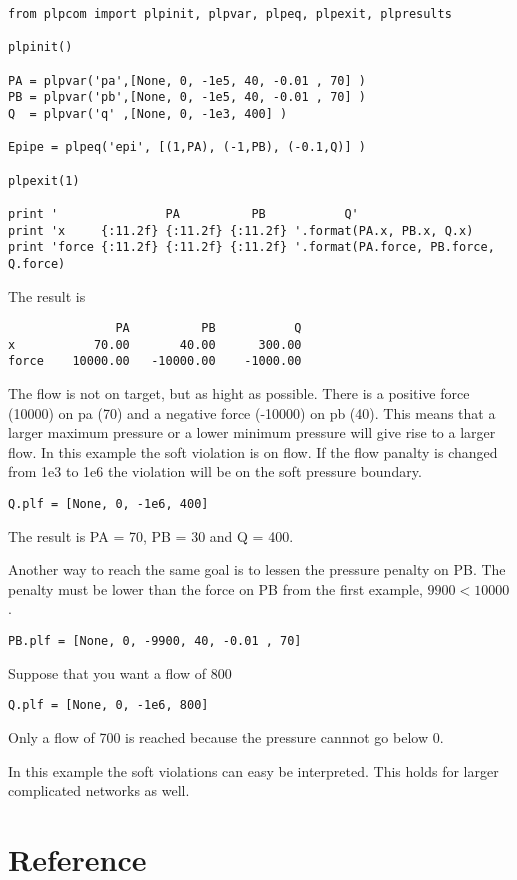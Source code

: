 \documentclass[]{article}
\begin{document}
\begin{verbatim}
from plpcom import plpinit, plpvar, plpeq, plpexit, plpresults

plpinit()

PA = plpvar('pa',[None, 0, -1e5, 40, -0.01 , 70] )
PB = plpvar('pb',[None, 0, -1e5, 40, -0.01 , 70] )
Q  = plpvar('q' ,[None, 0, -1e3, 400] )

Epipe = plpeq('epi', [(1,PA), (-1,PB), (-0.1,Q)] )

plpexit(1)

print '               PA          PB           Q'
print 'x     {:11.2f} {:11.2f} {:11.2f} '.format(PA.x, PB.x, Q.x)
print 'force {:11.2f} {:11.2f} {:11.2f} '.format(PA.force, PB.force, Q.force)
\end{verbatim}
The result is 
\begin{verbatim}
               PA          PB           Q
x           70.00       40.00      300.00 
force    10000.00   -10000.00    -1000.00 
\end{verbatim}
The flow is not on target, but as hight as possible.
There is a positive force (10000) on pa (70) and a negative force (-10000) on pb (40).
This means that a larger maximum pressure or a lower minimum pressure
will give rise to a larger flow.
In this example the soft violation is on flow.
If the flow panalty is changed from 1e3 to 1e6 the violation will be on the soft pressure boundary.
\begin{verbatim}
Q.plf = [None, 0, -1e6, 400]
\end{verbatim}
The result is PA = 70, PB = 30 and Q = 400.

Another way to reach the same goal is to lessen the pressure penalty on PB.
The penalty must be lower than the force on PB from the first example, $9900 < 10000$.
\begin{verbatim}
PB.plf = [None, 0, -9900, 40, -0.01 , 70]
\end{verbatim}
Suppose that you want a flow of 800
\begin{verbatim}
Q.plf = [None, 0, -1e6, 800]
\end{verbatim}
Only a flow of 700 is reached because the pressure cannnot go below 0.

In this example the soft violations can easy be interpreted.
This holds for larger complicated networks as well.

\section{Reference}
\end{document}
